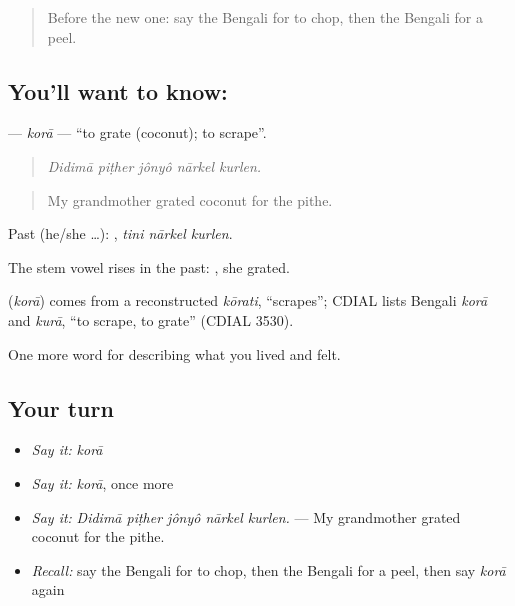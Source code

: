 \begin{quote}
Before the new one: say the Bengali for to chop, then the Bengali for a peel.
\end{quote}

\subsection*{You'll want to know: }
\textbf{} — \emph{korā} — \textquotedblleft{}to grate (coconut); to scrape\textquotedblright{}.

\begin{quote}
    
\end{quote}

\begin{quote}
\emph{Didimā piṭher jônyô nārkel kurlen.}
\end{quote}

\begin{quote}
My grandmother grated coconut for the pithe.
\end{quote}

Past (he/she …):   , \emph{tini nārkel kurlen}.

The stem vowel rises in the past: , she grated.

\begin{cousinweb}
\textbf{} (\emph{korā}) comes from a reconstructed \emph{kōrati}, \textquotedblleft{}scrapes\textquotedblright{}; CDIAL lists Bengali \emph{korā} and \emph{kurā}, \textquotedblleft{}to scrape, to grate\textquotedblright{} (CDIAL 3530).
\end{cousinweb}

\begin{grammarlens}[title={What you've built}]
One more word for describing what you lived and felt.
\end{grammarlens}

\subsection*{Your turn}
\begin{itemize}
\raggedright
  \item \emph{Say it:} \emph{korā}
  \item \emph{Say it:} \emph{korā}, once more
  \item \emph{Say it:} \emph{Didimā piṭher jônyô nārkel kurlen.} — My grandmother grated coconut for the pithe.
  \item \emph{Recall:} say the Bengali for to chop, then the Bengali for a peel, then say \emph{korā} again
\end{itemize}

